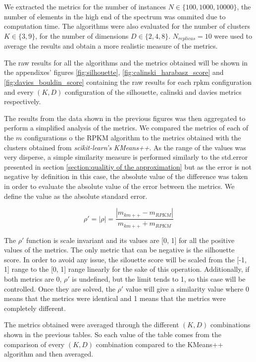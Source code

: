 We extracted the metrics for the number of instances $N \in \{100, 1000, 10000\}$, the number of elements in the high end of the spectrum was ommited due to computation time. The algorithms were also evaluated for the number of clusters $K \in \{3, 9\}$, for the number of dimensions $D \in \{2, 4, 8\}$. $N_{replicas}=10$ were used to average the results and obtain a more realistic measure of the metrics.

The raw results for all the algorithms and the metrics obtained will be shown in the appendixes' figures \ref{fig:silhouette}, \ref{fig:calinski_harabasz_score} and \ref{fig:davies_bouldin_score} containing the raw results for each rpkm configuration and every $(K, D)$ configuration of the silhouette, calinski and davies metrics respectively.


The results from the data shown in the previous figures was then aggregated to perform a simplified analysis of the metrics. We compared the metrics of each of the $m$ configurations o the RPKM algorithm to the metrics obtained with the clusters obtained from \textit{scikit-learn's KMeans++}. As the range of the values was very disperse, a simple similarity measure is performed similarly to the std.error presented in section \ref{section:qualitiy of the approximation} but as the error is not negative by definition in this case, the absolute value of the difference was taken in order to evaluate the absolute value of the error between the metrics. We define the value as the absolute standard error.

$$\rho' = |\rho| = \frac{|m_{km++} - m_{RPKM}|}{m_{km++} + m_{RPKM}}$$

The $\rho'$ function is scale invariant and its values are [0, 1] for all the positive values of the metrics. The only metric that can be negative is the silhouette score. In order to avoid any issue, the silouette score will be scaled from the [-1, 1] range to the [0, 1] range linearly for the sake of this operation. Additionally, if both metrics are 0, $\rho'$ is undefined, but the limit tends to 1, so this case will be controlled. Once they are solved, the $\rho'$ value will give a similarity value where 0 means that the metrics were identical and 1 means that the metrics were completely different.

The metrics obtained were averaged through the different $(K, D)$ combinations shown in the previous tables. So each value of the table comes from the comparison of every $(K, D)$ combination compared to the KMeans++ algorithm and then averaged.

